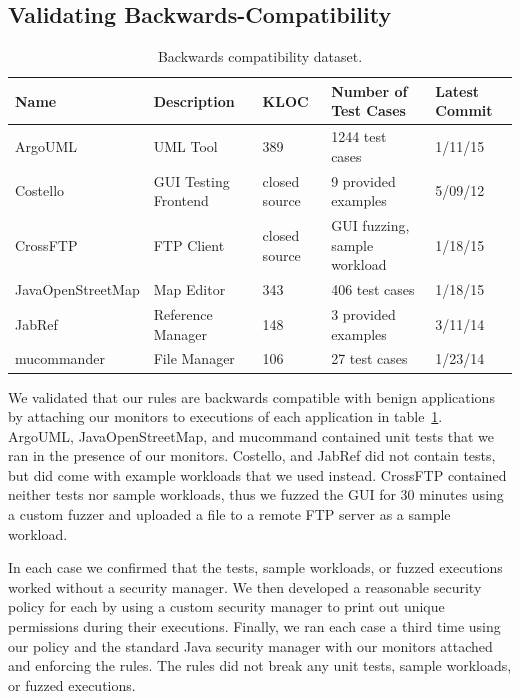 \documentclass{sig-alternate}
\begin{document}
\subsection{Validating Backwards-Compatibility}\label{sec:backcompat}
\begin{table}
\caption{\label{tab:validation-programs}
Backwards compatibility dataset.}
\centering

\begin{tabular}{lllll}
\toprule 
\textbf{Name} & \textbf{Description} & \textbf{KLOC} & \textbf{Number of Test Cases} & \textbf{Latest Commit}\tabularnewline
\midrule
ArgoUML & UML Tool & 389 & 1244 test cases & 1/11/15 \tabularnewline
Costello & GUI Testing Frontend & closed source & 9 provided examples & 5/09/12 \tabularnewline
CrossFTP & FTP Client & closed source & GUI fuzzing, sample workload & 1/18/15 \tabularnewline
JavaOpenStreetMap & Map Editor & 343 & 406 test cases & 1/18/15 \tabularnewline
JabRef & Reference Manager & 148 & 3 provided examples & 3/11/14 \tabularnewline 
mucommander & File Manager & 106 & 27 test cases & 1/23/14 \tabularnewline
\bottomrule
\end{tabular}
\vspace{-0.5cm}
\end{table}

We validated that our rules are backwards compatible with benign applications by attaching our monitors to executions of each application in table~\ref{tab:validation-programs}. ArgoUML, JavaOpenStreetMap, and mucommand contained unit tests that we ran in the presence of our monitors. Costello, and JabRef did not contain tests, but did come with example workloads that we used instead. CrossFTP contained neither tests nor sample workloads, thus we fuzzed the GUI for 30 minutes using a custom fuzzer and uploaded a file to a remote FTP server as a sample workload.  

In each case we confirmed that the tests, sample workloads, or fuzzed executions worked without a security manager. We then developed a reasonable security policy for each by using a custom security manager to print out unique permissions during their executions. Finally, we ran each case a third time using our policy and the standard Java security manager with our monitors attached and enforcing the rules. The rules did not break any unit tests, sample workloads, or fuzzed executions.
\end{document}

